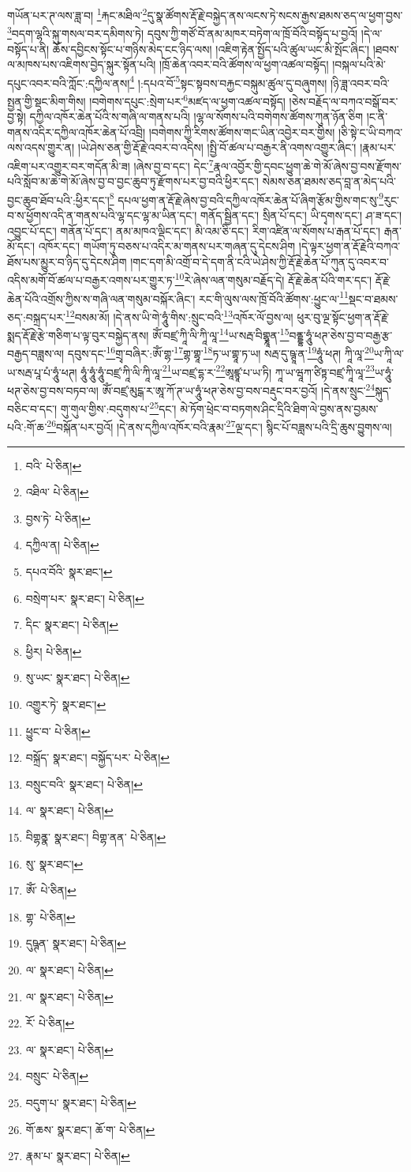 གཡོན་པར་ཊ་ལས་ཟླ་བ། \footnote{བའི་  པེ་ཅིན། }རྐང་མཐིལ་\footnote{འཐིལ་  པེ་ཅིན། }དུ་སྣ་ཚོགས་རྡོ་རྗེ་བསྐྱེད་ནས་ལངས་ཏེ་སངས་རྒྱས་ཐམས་ཅད་ལ་ཕྱག་བྱས་\footnote{བྱས་ཏེ་  པེ་ཅིན། }བདག་ལྷའི་སྐུ་གསལ་བར་དམིགས་ཏེ། དབུས་ཀྱི་གཙོ་བོ་ནམ་མཁར་བཏེག་ལ་ཁྲོ་བོའི་བསྟོད་པ་བྱའོ། །དེ་ལ་བསྟོད་པ་ནི། ཆོས་དབྱིངས་སྟོང་པ་གཉིས་མེད་ངང་ཉིད་ལས། །འཇིག་རྟེན་སྤྱོད་པའི་ཚུལ་ཡང་མི་སྤོང་ཞིང་། །ཐབས་ལ་མཁས་པས་འཇིགས་བྱེད་སྐུར་སྟོན་པའི། །ཁྲོ་ཆེན་འབར་བའི་ཚོགས་ལ་ཕྱག་འཚལ་བསྟོད། །བསྐལ་པའི་མེ་དཔུང་འབར་བའི་ཀློང་:དཀྱིལ་ནས།\footnote{དཀྱིལ་ན།  པེ་ཅིན། } །:དཔའ་བོ་\footnote{དཔའ་བོའི་  སྣར་ཐང་། }སྟང་སྟབས་བརྐྱང་བསྐུམ་ཚུལ་དུ་བཞུགས། །ཉི་ཟླ་འབར་བའི་སྤྱན་གྱི་སྡང་མིག་གིས། །བགེགས་དཔུང་:སྲེག་པར་\footnote{བསྲེག་པར་  སྣར་ཐང་།  པེ་ཅིན། }མཛད་ལ་ཕྱག་འཚལ་བསྟོད། །ཅེས་བརྗོད་ལ་བཀའ་བསྒོ་བར་བྱ་སྟེ། དཀྱིལ་འཁོར་ཆེན་པོའི་ས་གཞི་ལ་གནས་པའི། །ལྷ་ལ་སོགས་པའི་བགེགས་ཚོགས་ཀུན་ཉོན་ཅིག །ང་ནི་གནས་འདིར་དཀྱིལ་འཁོར་ཆེན་པོ་འབྲི། །བགེགས་ཀྱི་རིགས་ཚོགས་གང་ཡིན་འབྱེར་བར་གྱིས། །ཅི་སྟེ་ང་ཡི་བཀའ་ལས་འདས་གྱུར་ན། །ཡེ་ཤེས་ཅན་གྱི་རྡོ་རྗེ་འབར་བ་འདིས། །སྤྱི་བོ་ཚལ་པ་བརྒྱར་ནི་འགས་འགྱུར་ཞིང་། །རྣམ་པར་འཇིག་པར་འགྱུར་བར་གདོན་མི་ཟ། །ཞེས་བྱ་བ་དང་། དེང་\footnote{དིང་  སྣར་ཐང་།  པེ་ཅིན། }རྣལ་འབྱོར་གྱི་དབང་ཕྱུག་ཆེ་གེ་མོ་ཞེས་བྱ་བས་རྫོགས་པའི་སློབ་མ་ཆེ་གེ་མོ་ཞེས་བྱ་བ་བྱང་ཆུབ་ཏུ་རྫོགས་པར་བྱ་བའི་ཕྱིར་དང་། སེམས་ཅན་ཐམས་ཅད་བླ་ན་མེད་པའི་བྱང་ཆུབ་ཐོབ་པའི་:ཕྱིར་དང་།\footnote{ཕྱིར།  པེ་ཅིན། } དཔལ་ཕྱག་ན་རྡོ་རྗེ་ཞེས་བྱ་བའི་དཀྱིལ་འཁོར་ཆེན་པོ་ཞིག་རྩོམ་གྱིས་གང་སུ་\footnote{སུ་ཡང་  སྣར་ཐང་།  པེ་ཅིན། }རུང་བ་ས་ཕྱོགས་འདི་ན་གནས་པའི་ལྷ་དང་ལྷ་མ་ཡིན་དང་། གནོད་སྦྱིན་དང་། སྲིན་པོ་དང་། ཡི་དྭགས་དང་། ཤ་ཟ་དང་། འབྱུང་པོ་དང་། གནོན་པོ་དང་། ནམ་མཁའ་ལྡིང་དང་། མི་འམ་ཅི་དང་། རིག་འཛིན་ལ་སོགས་པ་རྒན་པོ་དང་། རྒན་མོ་དང་། འཁོར་དང་། གཡོག་ཏུ་བཅས་པ་འདིར་མ་གནས་པར་གཞན་དུ་དེངས་ཤིག །དེ་ལྟར་ཕྱག་ན་རྡོ་རྗེའི་བཀའ་ཐོས་པས་མྱུར་བ་ཉིད་དུ་དེངས་ཤིག །གང་དག་མི་འགྲོ་བ་དེ་དག་ནི་ངའི་ཡེ་ཤེས་ཀྱི་རྡོ་རྗེ་ཆེན་པོ་ཀུན་དུ་འབར་བ་འདིས་མགོ་བོ་ཚལ་པ་བརྒྱར་འགས་པར་གྱུར་ཏ་\footnote{འགྱུར་ཏེ་  སྣར་ཐང་། }རེ་ཞེས་ལན་གསུམ་བརྗོད་དེ། རྡོ་རྗེ་ཆེན་པོའི་གར་དང་། རྡོ་རྗེ་ཆེན་པོའི་འགྲོས་ཀྱིས་ས་གཞི་ལན་གསུམ་བསྐོར་ཞིང་། རང་གི་ལུས་ལས་ཁྲོ་བོའི་ཚོགས་:ཕྱུང་ལ་\footnote{ཕྱུང་བ་  པེ་ཅིན། }སྡང་བ་ཐམས་ཅད་:བསྐྲད་པར་\footnote{བསྐྲོད་  སྣར་ཐང་། བསྐྱོད་པར་  པེ་ཅིན། }བསམ་མོ། །དེ་ནས་ཡི་གེ་ཧཱུཾ་གིས་:སྲུང་བའི་\footnote{བསྲུང་བའི་  སྣར་ཐང་།  པེ་ཅིན། }འཁོར་ལོ་བྱས་ལ། ཕུར་བུ་ལྔ་སྟོང་ཕྱག་ན་རྡོ་རྗེ་སྨད་རྡོ་རྗེ་རྩེ་གཅིག་པ་ལྟ་བུར་བསྐྱེད་ནས། ཨོཾ་བཛྲ་ཀཱི་ལི་ཀཱི་ལཱ་\footnote{ལ་  སྣར་ཐང་།  པེ་ཅིན། }ཡ་སརྦ་བིགྷྣཱན་\footnote{བིགྷནྣ་  སྣར་ཐང་། བིགྷ་ནན་  པེ་ཅིན། }བནྡྷ་ཧཱུཾ་ཕཊ་ཅེས་བྱ་བ་བརྒྱ་རྩ་བརྒྱད་བཟླས་ལ། དབུས་དང་\footnote{སུ་  སྣར་ཐང་། }གྲྭ་བཞིར་:ཨོཾ་གྷ་\footnote{ཨོཾ་  པེ་ཅིན། }གྷ་གྷཱ་\footnote{གྷ་  པེ་ཅིན། }ཏ་ཡ་གྷཱ་ཏ་ཡ། སརྦ་དུ་ཥྚཱ་ན་\footnote{དུཥྚན་  སྣར་ཐང་།  པེ་ཅིན། }ཧཱུཾ་ཕཊ། ཀཱི་ལཱ་\footnote{ལ་  སྣར་ཐང་།  པེ་ཅིན། }ཡ་ཀཱི་ལ་ཡ་སརྦ་པཱ་པཾ་ཧཱུཾ་ཕཊ། ཧཱུཾ་ཧཱུཾ་ཧཱུཾ་བཛྲ་ཀཱི་ལི་ཀཱི་ལཱ་\footnote{ལ་  སྣར་ཐང་།  པེ་ཅིན། }ཡ་བཛྲ་དྷ་ར་\footnote{རོ་  པེ་ཅིན། }ཨཱཛྙཱ་པ་ཡ་ཏི། ཀཱ་ཡ་ཝཱཀ་ཙིཏྟ་བཛྲ་ཀཱི་ལཱ་\footnote{ལ་  སྣར་ཐང་།  པེ་ཅིན། }ཡ་ཧཱུཾ་ཕཊ་ཅེས་བྱ་བས་བཏབ་ལ། ཨོཾ་བཛྲ་མུངྒ་ར་ཨཱ་ཀོ་ཊ་ཡ་ཧཱུཾ་ཕཊ་ཅེས་བྱ་བས་བརྡུང་བར་བྱའོ། །དེ་ནས་སྲུང་\footnote{བསྲུང་  པེ་ཅིན། }སྐུད་བཅིང་བ་དང་། གུ་གུལ་གྱིས་:བདུགས་པ་\footnote{བདུག་པ་  སྣར་ཐང་།  པེ་ཅིན། }དང་། མེ་ཏོག་ཕྲེང་བ་བཏགས་ཤིང་དྲིའི་ཐིག་ལེ་བྱས་ནས་བྱམས་པའི་:གོ་ཆ་\footnote{གོ་ཆས་  སྣར་ཐང་། ཆོ་ག་  པེ་ཅིན། }བསྐོན་པར་བྱའོ། །དེ་ནས་དཀྱིལ་འཁོར་བའི་རྣམ་\footnote{རྣམ་པ་  སྣར་ཐང་།  པེ་ཅིན། }ལྔ་དང་། སྙིང་པོ་བཟླས་པའི་དྲི་ཆུས་བྱུགས་ལ། 